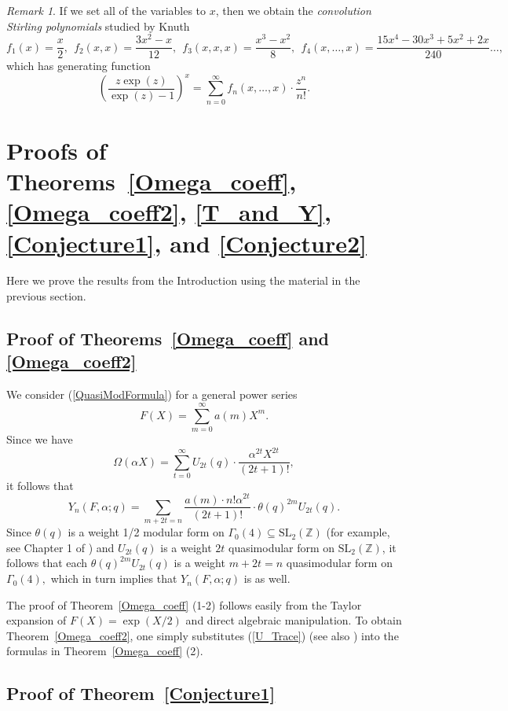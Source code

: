 \documentclass[11pt]{amsart}
\theoremstyle{definition}
\theoremstyle{remark}
\newtheorem*{remark}{Remark}
\numberwithin{equation}{section}
\newcommand{\SL}{\mathrm{SL}}
\newcommand{\Z}{\mathbb Z}
\begin{document}
\begin{remark} If we set all of the variables to $x$, then we obtain the  {\it convolution Stirling polynomials} studied by Knuth \cite{Knuth}
$$
f_1(x)=\frac{x}{2},\ \ f_2(x,x)=\frac{3x^2-x}{12}, \ \ f_3(x,x,x)=\frac{x^3-x^2}{8},\ \ f_4(x,\dots,x)=\frac{15x^4-30x^3+5x^2+2x}{240}\dots,
$$
which has generating function
$$
\left(\frac{z\exp(z)}{\exp(z)-1}\right)^x=\sum_{n=0}^{\infty}
f_n(x,\dots,x)\cdot \frac{z^n}{n!}.
$$
\end{remark}




\section{Proofs of Theorems~\ref{Omega_coeff}, \ref{Omega_coeff2}, \ref{T_and_Y}, \ref{Conjecture1}, and \ref{Conjecture2}}\label{Proofs}


Here we prove the results from the Introduction using the material in the previous section.

\subsection{Proof of Theorems~\ref{Omega_coeff} and \ref{Omega_coeff2}}
We consider (\ref{QuasiModFormula}) for a general power series
$$ F(X)=\sum_{m=0}^{\infty}a(m)X^m.
$$
Since we have
$$
\Omega(\alpha X)=\sum_{t=0}^{\infty} U_{2t}(q)\cdot \frac{\alpha^{2t} X^{2t}}{(2t+1)!},
$$
it follows that
$$
Y_n(F,\alpha;q)=\sum_{m+2t=n}
\frac{a(m)\cdot n! \alpha^{2t}}{(2t+1)!}\cdot \theta(q)^{2m}U_{2t}(q).
$$
Since $\theta(q)$ is a weight 1/2 modular form on $\Gamma_0(4)\subseteq \SL_2(\Z)$ (for example, see Chapter 1 of \cite{CBMS}) and $U_{2t}(q)$ is a weight $2t$ quasimodular form on $\SL_2(\Z)$, it follows that each $\theta(q)^{2m}U_{2t}(q)$ is a weight $m+2t=n$ quasimodular form on $\Gamma_0(4),$ which in turn implies that $Y_n(F,\alpha;q)$ is as well.

The proof of Theorem~\ref{Omega_coeff} (1-2) follows easily from the Taylor expansion of $F(X)=\exp(X/2)$ and direct algebraic manipulation.
To obtain Theorem~\ref{Omega_coeff2}, one simply substitutes (\ref{U_Trace}) (see also \cite[Thm. 1.3 (1)]{AOS}) into the formulas in Theorem~\ref{Omega_coeff} (2).


\subsection{Proof of Theorem~\ref{Conjecture1}}
\end{document}
